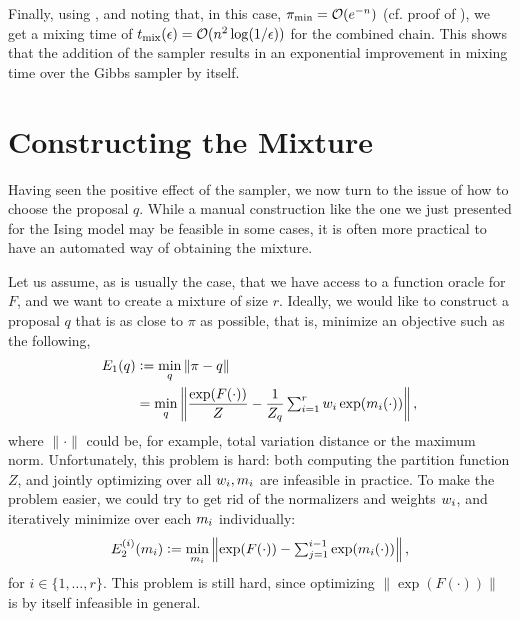 Finally, using , and noting that, in this case, $\pi_{\textrm{min}} = \mathcal{O}(e^{-n})$ (cf. proof of ), we get a mixing time of $t_{\mathrm{mix}}(\epsilon) = \mathcal{O}(n^2 \log(1 / \epsilon))$ for the combined chain.
This shows that the addition of the \Ms{} sampler results in an exponential improvement in mixing time over the Gibbs sampler by itself.

\section{Constructing the Mixture}
Having seen the positive effect of the \Ms{} sampler, we now turn to the issue of how to choose the proposal $q$.
While a manual construction like the one we just presented for the Ising model may be feasible in some cases, it is often more practical to have an automated way of obtaining the mixture.

Let us assume, as is usually the case, that we have access to a function oracle for $F$, and we want to create a mixture of size $r$.
Ideally, we would like to construct a proposal $q$ that is as close to $\pi$ as possible, that is, minimize an objective such as the following,
\begin{align*}
  E_1(q) &\vcentcolon= \min_q \| \pi - q \|\\
         &= \min_q \left\| \frac{\exp(F(\cdot))}{Z} - \frac{1}{Z_q}\textstyle\sum_{i = 1}^r w_i\exp(m_i(\cdot)) \right\|,
\end{align*}
where $\| \cdot \|$ could be, for example, total variation distance or the maximum norm.
Unfortunately, this problem is hard: both computing the partition function $Z$, and jointly optimizing over all $w_i, m_i$ are infeasible in practice.
To make the problem easier, we could try to get rid of the normalizers and weights $w_i$, and iteratively minimize over each $m_i$ individually:
\begin{align*}
  E_2^{(i)}(m_i) \vcentcolon= \min_{m_i} \left\| \exp(F(\cdot)) - \textstyle\sum_{j = 1}^{i-1} \exp(m_i(\cdot)) \right\|,
\end{align*}
for $i \in \{1, \ldots, r\}$.
This problem is still hard, since optimizing $\| \exp(F(\cdot)) \|$ is by itself infeasible in general.


